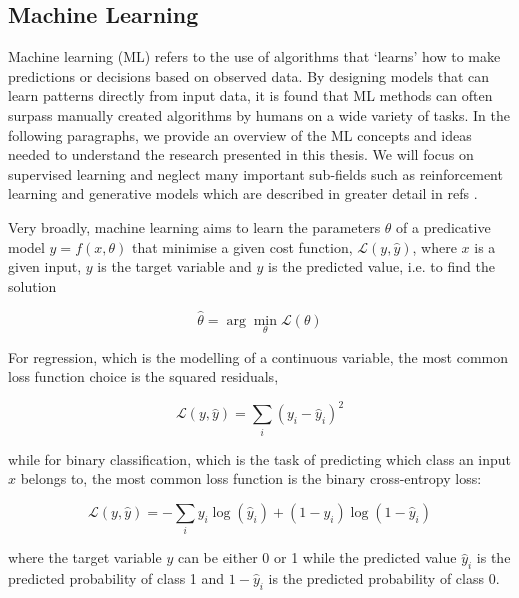 \subsection{Machine Learning} \label{ch:machine_learning}

Machine learning (ML) refers to the use of algorithms that `learns' how to make predictions or decisions based on observed data. By designing models that can learn patterns directly from input data, it is found that ML methods can often surpass manually created algorithms by humans on a wide variety of tasks. In the following paragraphs, we provide an overview of the ML concepts and ideas needed to understand the research presented in this thesis. We will focus on supervised learning and neglect many important sub-fields such as reinforcement learning and generative models which are described in greater detail in refs \cite{Bishop2006PatternRecognition, Goodfellow2016DeepLearning}.

Very broadly, machine learning aims to learn the parameters $\theta$ of a predicative model $y = f (x, \theta)$ that minimise a given cost function, $\mathcal{L}(y, \hat{y})$, where $x$ is a given input, $y$ is the target variable and $\hat{y}$ is the predicted value, i.e. to find the solution

\begin{equation}
 \hat{\theta} = \arg\min_{\theta} \mathcal{L}(\theta)
\end{equation}

For regression, which is the modelling of a continuous variable, the most common loss function choice is the squared residuals,

\begin{equation}
 \mathcal{L}(y, \hat{y}) = \sum_{i}(y_i - \hat{y}_i)^{2}
\end{equation}

while for binary classification, which is the task of predicting which class an input $x$ belongs to, the most common loss function is the binary cross-entropy loss:

\begin{equation}
 \mathcal{L}(y, \hat{y}) = -\sum_{i}y_i\log(\hat{y}_i) + (1 - y_i)\log(1 - \hat{y}_i)
\end{equation}

where the target variable $y$ can be either 0 or 1 while the predicted value $\hat{y}_i$ is the predicted probability of class 1 and $1-\hat{y}_i$ is the predicted probability of class 0.

